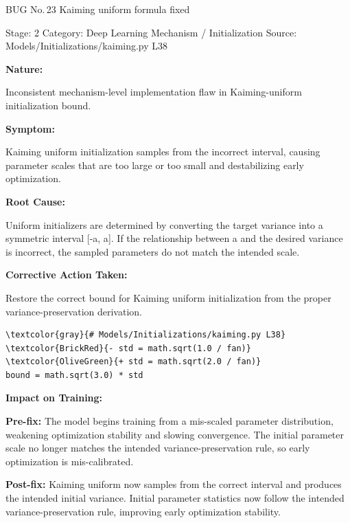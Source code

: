 \documentclass[10pt]{article}
\newcommand{\FieldLabel}[1]{%
 {\bfseries #1:}\par
}
\begin{document}
\begin{bugbox}{BUG No.\,23 \quad Kaiming uniform formula fixed}
{\color{MetaGray}\small Stage: 2 \;\textbar\; Category: Deep Learning Mechanism / Initialization \;\textbar\; Source: Models/Initializations/kaiming.py L38\par}
\vspace{0.22em}
\FieldLabel{Nature}
Inconsistent mechanism-level implementation flaw in Kaiming-uniform initialization bound.
\par
\vspace{0.35em}
\FieldLabel{Symptom}
Kaiming uniform initialization samples from the incorrect interval, causing parameter scales that are too large or too small and destabilizing early optimization.
\par
\vspace{0.35em}
\FieldLabel{Root Cause}
Uniform initializers are determined by converting the target variance into a symmetric interval {[}-a, a{]}. If the relationship between a and the desired variance is incorrect, the sampled parameters do not match the intended scale.
\par
\vspace{0.35em}
\FieldLabel{Corrective Action Taken}
Restore the correct bound for Kaiming uniform initialization from the proper variance-preservation derivation.
\par
\vspace{0.35em}
\begin{Verbatim}[commandchars=\\\{\},fontsize=\footnotesize,breaklines=true,breaksymbol={},frame=leftline,framerule=2pt,rulecolor=\color{gray!40},xleftmargin=6pt,formatcom=\singlespacing]
\textcolor{gray}{# Models/Initializations/kaiming.py L38}
\textcolor{BrickRed}{- std = math.sqrt(1.0 / fan)}
\textcolor{OliveGreen}{+ std = math.sqrt(2.0 / fan)}
bound = math.sqrt(3.0) * std
\end{Verbatim}
\vspace{0.22em}
\FieldLabel{Impact on Training}
\textbf{Pre-fix:} The model begins training from a mis-scaled parameter distribution, weakening optimization stability and slowing convergence. The initial parameter scale no longer matches the intended variance-preservation rule, so early optimization is mis-calibrated. \par\smallskip
\textbf{Post-fix:} Kaiming uniform now samples from the correct interval and produces the intended initial variance. Initial parameter statistics now follow the intended variance-preservation rule, improving early optimization stability. 
\par
\vspace{0.35em}
\end{bugbox}
\end{document}
